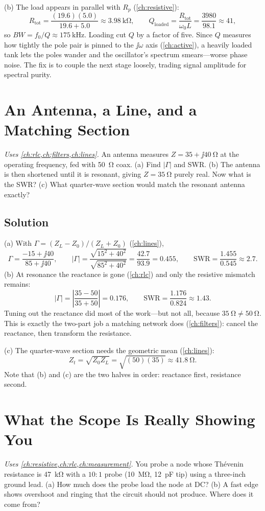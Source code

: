 (b) The load appears in parallel with \(R_p\) (\cref{ch:resistive}):
\[
R_{\text{tot}}=\frac{(19.6)(5.0)}{19.6+5.0}\approx\SI{3.98}{\kilo\ohm},
\qquad
Q_{\text{loaded}}=\frac{R_{\text{tot}}}{\omega_0L}=\frac{3980}{98.1}\approx41,
\]
so \(BW=f_0/Q\approx\SI{175}{\kilo\hertz}\). Loading cut \(Q\) by a factor of
five. Since \(Q\) measures how tightly the pole pair is pinned to the \(\jj\omega\)
axis (\cref{ch:active}), a heavily loaded tank lets the poles wander and the
oscillator's spectrum smears---worse phase noise. The fix is to couple the next stage
loosely, trading signal amplitude for spectral purity.

\section{An Antenna, a Line, and a Matching Section}
\emph{Uses \cref{ch:rlc,ch:filters,ch:lines}.} An antenna measures
\(Z=35+\jj40\ \si{\ohm}\) at the operating frequency, fed with \SI{50}{\ohm} coax.
(a) Find \(|\Gamma|\) and SWR. (b) The antenna is then shortened until it is resonant,
giving \(Z=\SI{35}{\ohm}\) purely real. Now what is the SWR? (c) What quarter-wave
section would match the resonant antenna exactly?

\subsection*{Solution}
(a) With \(\Gamma=(Z_L-Z_0)/(Z_L+Z_0)\) (\cref{ch:lines}),
\[
\Gamma=\frac{-15+\jj40}{85+\jj40},
\qquad
|\Gamma|=\frac{\sqrt{15^2+40^2}}{\sqrt{85^2+40^2}}=\frac{42.7}{93.9}=0.455,
\qquad
\mathrm{SWR}=\frac{1.455}{0.545}\approx2.7 .
\]
(b) At resonance the reactance is gone (\cref{ch:rlc}) and only the resistive
mismatch remains:
\[
|\Gamma|=\left|\frac{35-50}{35+50}\right|=0.176,
\qquad
\mathrm{SWR}=\frac{1.176}{0.824}\approx1.43 .
\]
Tuning out the reactance did most of the work---but not all, because
\(\SI{35}{\ohm}\ne\SI{50}{\ohm}\). This is exactly the two-part job a matching network
does (\cref{ch:filters}): cancel the reactance, then transform the resistance.

(c) The quarter-wave section needs the geometric mean (\cref{ch:lines}):
\[
Z_t=\sqrt{Z_0Z_L}=\sqrt{(50)(35)}\approx\SI{41.8}{\ohm}.
\]
Note that (b) and (c) are the two halves in order: reactance first, resistance second.

\section{What the Scope Is Really Showing You}
\emph{Uses \cref{ch:resistive,ch:rlc,ch:measurement}.} You probe a node whose
Th\'evenin resistance is \SI{47}{\kilo\ohm} with a \(10\!:\!1\) probe
(\SI{10}{\mega\ohm}, \SI{12}{\pico\farad} tip) using a three-inch ground lead.
(a) How much does the probe load the node at DC? (b) A fast edge shows overshoot and
ringing that the circuit should not produce. Where does it come from?

